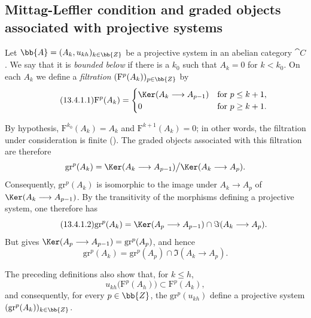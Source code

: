 \subsection{Mittag-Leffler condition and graded objects associated with projective systems}
\label{subsection:0.13.4}

\begin{env}[13.4.1]
\label{0.13.4.1}
Let
$\bb{A}=(A_k,u_{kh})_{k\in\bb{Z}}$ be a projective system in an
abelian category $\cat{C}$.
We say that it is \emph{bounded below} if there is a $k_0$ such that
$A_k=0$ for $k<k_0$.
On each $A_k$ we define a \emph{filtration}
$(\mathrm{F}^p(A_k))_{p\in\bb{Z}}$ by
\begin{equation}
\label{0.13.4.1.1}
\tag{13.4.1.1}
  \mathrm{F}^p(A_k)=
  \begin{cases}
    \Ker(A_k\longrightarrow A_{p-1}) & \text{for }p\leq k+1,\\
    0 & \text{for }p\geq k+1.
  \end{cases}
\end{equation}

By hypothesis,
$\mathrm{F}^{k_0}(A_k)=A_k$ and
$\mathrm{F}^{k+1}(A_k)=0$; in other words, the filtration under
consideration is finite ().
The graded objects associated with this filtration are therefore
\[
  \mathrm{gr}^p(A_k)
  =
  \Ker(A_k\longrightarrow A_{p-1})
  \big/
  \Ker(A_k\longrightarrow A_p).
\]
Consequently, $\mathrm{gr}^p(A_k)$ is isomorphic to the image under
$A_k\longrightarrow A_p$ of
$\Ker(A_k\longrightarrow A_{p-1})$.
By the transitivity of the morphisms defining a projective system,
one therefore has
\begin{equation}
\label{0.13.4.1.2}
\tag{13.4.1.2}
  \mathrm{gr}^p(A_k)
  =
  \Ker(A_p\longrightarrow A_{p-1})
  \cap
  \Im(A_k\longrightarrow A_p).
\end{equation}
But  gives
$\Ker(A_p\longrightarrow A_{p-1})=\mathrm{gr}^p(A_p)$, and hence
\begin{equation}
\label{0.13.4.1.3}
\tag{13.4.1.3}
  \mathrm{gr}^p(A_k)
  =
  \mathrm{gr}^p(A_p)
  \cap
  \Im(A_k\longrightarrow A_p).
\end{equation}

The preceding definitions also show that, for $k\leq h$,
\[
  u_{kh}\bigl(\mathrm{F}^p(A_h)\bigr)
  \subset
  \mathrm{F}^p(A_k),
\]
and consequently, for every $p\in\bb{Z}$, the
$\mathrm{gr}^p(u_{kh})$ define a projective system
$(\mathrm{gr}^p(A_k))_{k\in\bb{Z}}$.
\end{env}

